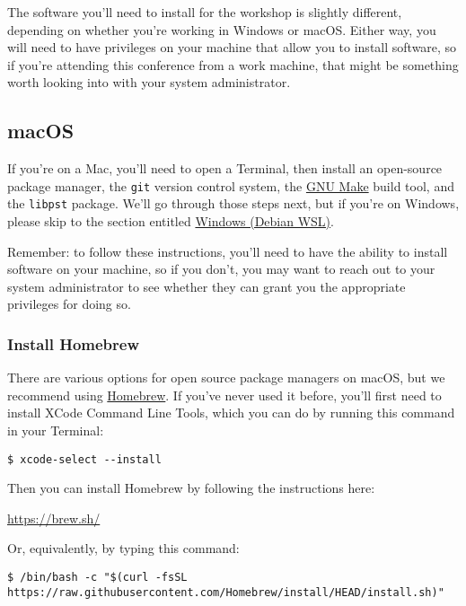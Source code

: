 \documentclass[11pt]{article}
\begin{document}
The software you'll need to install for the workshop is slightly
different, depending on whether you're working in Windows or macOS.
Either way, you will need to have privileges on your machine that
allow you to install software, so if you're attending this conference
from a work machine, that might be something worth looking into with
your system administrator.

\subsection*{macOS}
\label{sec:org4b905a9}

If you're on a Mac, you'll need to open a Terminal, then install an
open-source package manager, the \texttt{git} version control system, the \href{https://www.gnu.org/software/make/}{GNU
Make} build tool, and the \texttt{libpst} package.  We'll go through those
steps next, but if you're on Windows, please skip to the section
entitled \hyperref[orga74c73d]{Windows (Debian WSL)}.

Remember: to follow these instructions, you'll need to have the
ability to install software on your machine, so if you don't, you may
want to reach out to your system administrator to see whether they can
grant you the appropriate privileges for doing so.

\subsubsection*{Install Homebrew}
\label{sec:org048cbb6}

There are various options for open source package managers on macOS,
but we recommend using \href{https://brew.sh}{Homebrew}.  If you've never used it
before, you'll first need to install XCode Command Line Tools, which
you can do by running this command in your Terminal:

\begin{verbatim}
$ xcode-select --install
\end{verbatim}

Then you can install Homebrew by following the instructions here:

\url{https://brew.sh/}

Or, equivalently, by typing this command:

\footnotesize

\begin{verbatim}
$ /bin/bash -c "$(curl -fsSL https://raw.githubusercontent.com/Homebrew/install/HEAD/install.sh)"
\end{verbatim}
\end{document}
